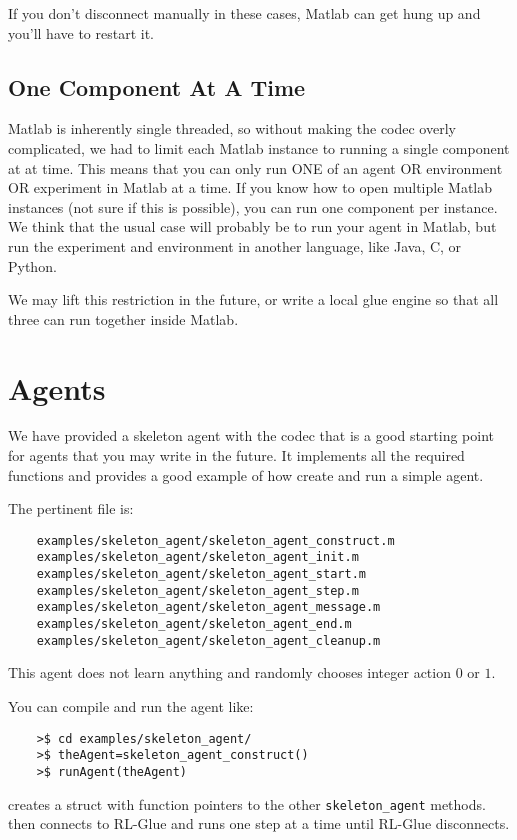\documentclass[11pt]{article}
\begin{document}
If you don't disconnect manually in these cases, Matlab can get hung up and you'll have to restart it.

\subsection{One Component At A Time}
Matlab is inherently single threaded, so without making the codec overly complicated, we had to limit each Matlab instance to running a single component at at time.
This means that you can only run ONE of an agent OR environment OR experiment in Matlab at a time.  If you know how to open multiple Matlab instances (not sure if this is possible), you can run one
component per instance.  We think that the usual case will probably be to run your agent in Matlab, but run the experiment and environment in another language, like Java, C, or Python.

We may lift this restriction in the future, or write a local glue engine so that all three can run together inside Matlab.

\section{Agents}
\label{sec:agent}
We have provided a skeleton agent with the codec that is a good starting point for agents that you may write in the future.
It implements all the required functions and provides a good example of how create and run a simple agent.

The pertinent file is:
\begin{verbatim}
	examples/skeleton_agent/skeleton_agent_construct.m
	examples/skeleton_agent/skeleton_agent_init.m
	examples/skeleton_agent/skeleton_agent_start.m
	examples/skeleton_agent/skeleton_agent_step.m
	examples/skeleton_agent/skeleton_agent_message.m
	examples/skeleton_agent/skeleton_agent_end.m
	examples/skeleton_agent/skeleton_agent_cleanup.m
\end{verbatim}

This agent does not learn anything and randomly chooses integer action $0$ or $1$.  

You can compile and run the agent like:
\begin{verbatim}
	>$ cd examples/skeleton_agent/
	>$ theAgent=skeleton_agent_construct()
	>$ runAgent(theAgent)
\end{verbatim}

 creates a struct with function pointers to the other \texttt{skeleton\_agent} methods.   then
connects to RL-Glue and runs one step at a time until RL-Glue disconnects.
\end{document}
